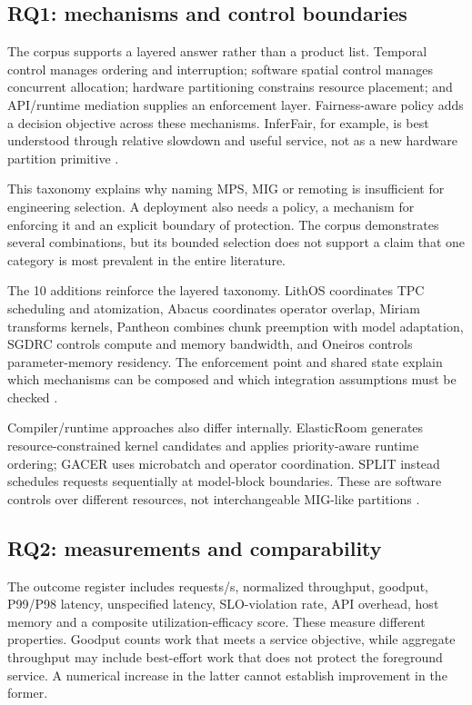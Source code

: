 \subsection{RQ1: mechanisms and control boundaries}
The corpus supports a layered answer rather than a product list. Temporal control manages ordering and interruption; software spatial control manages concurrent allocation; hardware partitioning constrains resource placement; and API/runtime mediation supplies an enforcement layer. Fairness-aware policy adds a decision objective across these mechanisms. InferFair, for example, is best understood through relative slowdown and useful service, not as a new hardware partition primitive \cite{P018}.

This taxonomy explains why naming MPS, MIG or remoting is insufficient for engineering selection. A deployment also needs a policy, a mechanism for enforcing it and an explicit boundary of protection. The corpus demonstrates several combinations, but its bounded selection does not support a claim that one category is most prevalent in the entire literature.

The 10 additions reinforce the layered taxonomy. LithOS coordinates TPC scheduling and atomization, Abacus coordinates operator overlap, Miriam transforms kernels, Pantheon combines chunk preemption with model adaptation, SGDRC controls compute and memory bandwidth, and Oneiros controls parameter-memory residency. The enforcement point and shared state explain which mechanisms can be composed and which integration assumptions must be checked \cite{s021,s022,s023,s024,s025,s026}.

Compiler/runtime approaches also differ internally. ElasticRoom generates resource-constrained kernel candidates and applies priority-aware runtime ordering; GACER uses microbatch and operator coordination. SPLIT instead schedules requests sequentially at model-block boundaries. These are software controls over different resources, not interchangeable MIG-like partitions \cite{s027,s028,s029}.

\subsection{RQ2: measurements and comparability}
The outcome register includes requests/s, normalized throughput, goodput, P99/P98 latency, unspecified latency, SLO-violation rate, API overhead, host memory and a composite utilization-efficacy score. These measure different properties. Goodput counts work that meets a service objective, while aggregate throughput may include best-effort work that does not protect the foreground service. A numerical increase in the latter cannot establish improvement in the former.

